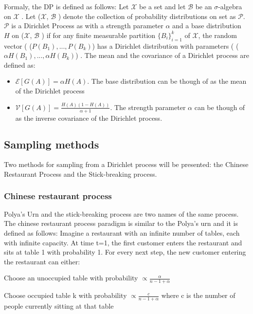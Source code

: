 \documentclass [twoside,hidelinks]{article}
\begin{document}
Formaly, the DP is defined as follows: Let $\mathcal{X}$ be a set and let $\mathcal{B}$ be an $\sigma$-algebra on $\mathcal{X}$ .  Let  ($\mathcal{X} $, $\mathcal{B}$ )  denote the collection of probability distributions on set as $\mathcal{P} $. $\mathcal{P}$ is a Dirichlet Process as with a strength parameter $\alpha$ and a base distribution $H$ on  ($\mathcal{X} $, $\mathcal{B} $ ) if for any finite measurable partition $ \{B_i\}_{i=1}^k$ of $\mathcal{X} $, the random vector  ( ($ P (B_1), ..., P (B_k)$) has a Dirichlet distribution with parameters  ( ($ \alpha H (B_1), ..., \alpha H (B_k)$) . The mean and the covariance of a Dirichlet process are defined as:
\begin{itemize}

	\item{ $ \mathcal{E} [G (A)] = \alpha H (A) $. The base distribution can be though of as the mean of the Dirichlet process}

	\item{$ \mathcal{V} [G (A)] = \frac{H (A) (1-H (A))}{\alpha + 1} $. The strength parameter $\alpha$ can be though of as the inverse covariance of the Dirichlet process. }
\end{itemize}

\subsection{Sampling methods}

Two methods for sampling from a Dirichlet process will be presented: the Chinese Restaurant Process and the Stick-breaking process.


\subsubsection{Chinese restaurant process}
\label{sec:crp}
Polya's Urn and the stick-breaking process are two names of the same process. The chinese restaurant process paradigm is similar to the Polya's urn and it is defined as follows:
Imagine a restaurant with an infinite number of tables, each with infinite capacity. At time t=1, the first customer enters the restaurant and sits at table 1 with probability 1. For every next step, the new customer entering the restaurant can either: 

\begin{compactitem}
	\item Choose an unoccupied table with probability $ \propto \frac{\alpha}{n-1+ \alpha }$
	\item Choose occupied table k with probability $ \propto  \frac{c}{n-1+ \alpha }$ where c is the number of people currently sitting at that table
\end{compactitem}
\end{document}
